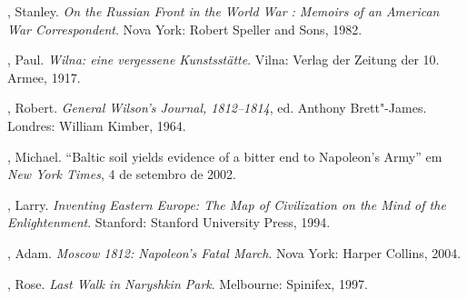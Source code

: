 \begin{bibliohedra}
, Stanley. \textit{On the Russian Front in the World War :
Memoirs of an American War Correspondent}. Nova York: Robert Speller and
Sons, 1982.

, Paul. \textit{Wilna: eine vergessene Kunstsstätte}. Vilna: Verlag
der Zeitung der 10. Armee, 1917.

, Robert. \textit{General Wilson's Journal, 1812--1814}, ed. Anthony
Brett"-James. Londres: William Kimber, 1964.

, Michael. ``Baltic soil yields evidence of a bitter end to
Napoleon's Army'' em \textit{New York Times}, 4 de setembro de 2002.

, Larry. \textit{Inventing Eastern Europe: The Map of Civilization on
the Mind of the Enlightenment}. Stanford: Stanford University Press,
1994.

, Adam. \textit{Moscow 1812: Napoleon's Fatal March}. Nova York:
Harper Collins, 2004.

, Rose. \textit{Last Walk in Naryshkin Park}. Melbourne:
Spinifex, 1997.
\end{bibliohedra}



